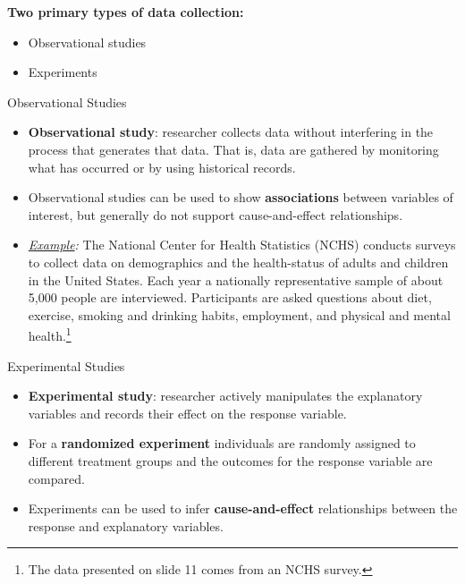 \documentclass[10pt]{beamer}
\begin{document}
\begin{frame}
\large \textbf{Two primary types of data collection:}
\begin{itemize}
\item Observational studies
\item Experiments
\end{itemize}
\end{frame}

\begin{frame}{Observational Studies}
\begin{itemize}
\item \textbf{Observational study}: researcher collects data without interfering in the process that generates that data.  That is, data are gathered by monitoring what has occurred or by using historical records.
\vspace{5pt} 
\item Observational studies can be used to show \textbf{associations} between variables of interest, but generally do not support cause-and-effect relationships.
\vspace{5pt} 
\item \emph{\underline{Example}:} The National Center for Health Statistics (NCHS) conducts surveys to collect data on demographics and the health-status of adults and children in the United States.  Each year a nationally representative sample of about 5,000 people are interviewed.  Participants are asked questions about diet, exercise, smoking and drinking habits, employment, and physical and mental health.\footnote{The data presented on slide 11 comes from an NCHS survey.} 
\end{itemize}
\end{frame}

\begin{frame}{Experimental Studies}
\begin{itemize}
\item \textbf{Experimental study}: researcher actively manipulates the explanatory variables and records their effect on the response variable.
\vspace{5pt}
\item For a \textbf{randomized experiment} individuals are randomly assigned to different treatment groups and the outcomes for the response variable are compared.
\vspace{5pt} 
\item Experiments can be used to infer \textbf{cause-and-effect} relationships between the response and explanatory variables.
\end{itemize}
\end{frame}
\end{document}
